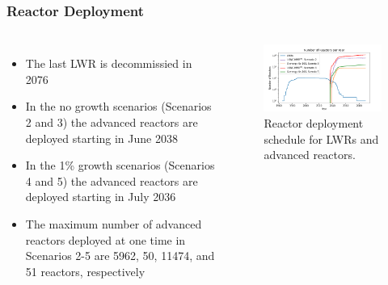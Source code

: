 \begin{frame}
    \frametitle{Reactor Deployment}
    \begin{columns}
        \column[t]{5cm}
        \begin{itemize}
            \item The last \gls{LWR} is decommissied in 2076
            \item In the no growth scenarios (Scenarios 2 and 3) the advanced reactors are 
                  deployed starting in June 2038
            \item In the 1\% growth scenarios (Scenarios 4 and 5) the advanced reactors are 
                  deployed starting in July 2036
            \item The maximum number of advanced reactors deployed at one time 
                  in Scenarios 2-5 are 5962, 50, 11474, and 51 reactors, respectively
        \end{itemize}

        \column[t]{5cm}
        \vspace{-1cm}
        \begin{figure}
            \centering 
            \includegraphics[scale=0.3]{figures/rxdeployment_scenarios_all.png}
            \caption{Reactor deployment schedule for \glspl{LWR} and 
            advanced reactors.}
            \label{fig:rx_deployment}
        \end{figure}
    \end{columns}
\end{frame}


